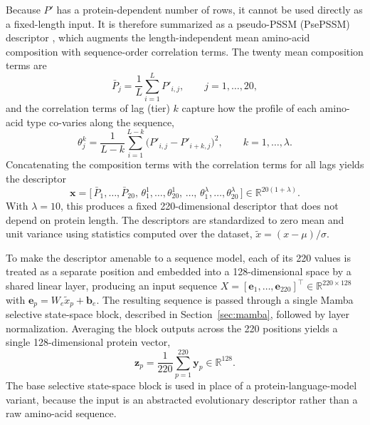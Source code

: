 \documentclass[conference]{IEEEtran}
\begin{document}
Because $P'$ has a protein-dependent number of rows, it cannot be used directly
as a fixed-length input. It is therefore summarized as a pseudo-PSSM (PsePSSM)
descriptor \cite{ref_psepssm}, which augments the length-independent mean
amino-acid composition with sequence-order correlation terms. The twenty mean
composition terms are
\begin{equation}
\bar{P}_{j} = \frac{1}{L} \sum_{i=1}^{L} P'_{i,j},
\qquad j = 1,\dots,20,
\label{eq:mean}
\end{equation}
and the correlation terms of lag (tier) $k$ capture how the profile of each
amino-acid type co-varies along the sequence,
\begin{equation}
\theta^{k}_{j} = \frac{1}{L-k}
\sum_{i=1}^{L-k} \bigl(P'_{i,j} - P'_{i+k,j}\bigr)^{2},
\qquad k = 1,\dots,\lambda.
\label{eq:corr}
\end{equation}
Concatenating the composition terms with the correlation terms for all lags
yields the descriptor
\begin{equation}
\mathbf{x} =
\bigl[\, \bar{P}_{1},\dots,\bar{P}_{20},\,
\theta^{1}_{1},\dots,\theta^{1}_{20},\,\dots,\,
\theta^{\lambda}_{1},\dots,\theta^{\lambda}_{20} \,\bigr]
\in \mathbb{R}^{20(1+\lambda)}.
\label{eq:psepssm}
\end{equation}
With $\lambda = 10$, this produces a fixed 220-dimensional descriptor that does
not depend on protein length. The descriptors are standardized to zero mean and
unit variance using statistics computed over the dataset,
$\tilde{x} = (x - \mu)/\sigma$.

To make the descriptor amenable to a sequence model, each of its 220 values is
treated as a separate position and embedded into a 128-dimensional space by a
shared linear layer, producing an input sequence
$X = [\mathbf{e}_1,\dots,\mathbf{e}_{220}]^{\top} \in \mathbb{R}^{220 \times
128}$ with $\mathbf{e}_p = W_e \tilde{x}_p + \mathbf{b}_e$. The resulting
sequence is passed through a single Mamba selective state-space block, described
in Section~\ref{sec:mamba}, followed by layer normalization. Averaging the
block outputs across the 220 positions yields a single 128-dimensional protein
vector,
\begin{equation}
\mathbf{z}_{p} = \frac{1}{220}\sum_{p=1}^{220} \mathbf{y}_{p}
\in \mathbb{R}^{128}.
\label{eq:proteinpool}
\end{equation}
The base selective state-space block is used in place of a
protein-language-model variant, because the input is an abstracted evolutionary
descriptor rather than a raw amino-acid sequence.
\end{document}
